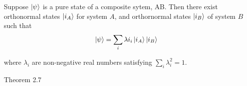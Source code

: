 \begin{teorema}\label{th:schmidt decomposition}
    Suppose $\ket{\psi}$ is a pure state of a composite sytem, AB. Then there exist orthonormal states $\ket{i_A}$ for system $A$, and orthornormal states $\ket{i_B}$ of system $B$ such that 
    \begin{equation}
        \ket{\psi} = \sum_{i} \lambda i_i \ket{i_A} \ket{i_B}
    \end{equation}

    where $\lambda_i$ are non-negative real numbers satisfying $\sum_i \lambda_i^2=1$.
    
    \cite{nielsen_chuang_2010} Theorem 2.7
\end{teorema}



\endinput
